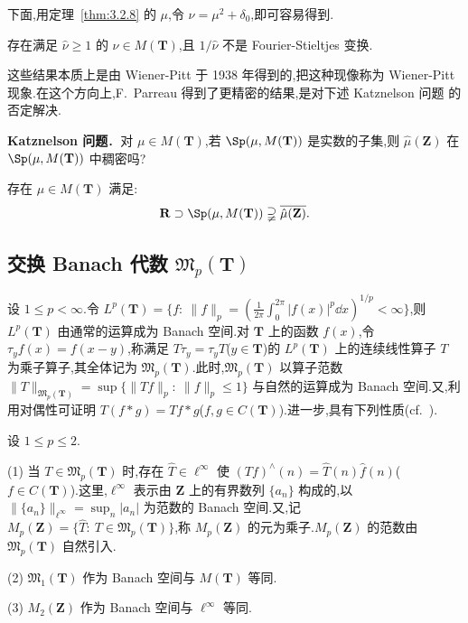 下面,用定理~\ref{thm:3.2.8} 的 $\mu$,令 $\nu = \mu^{2} + \delta_{0}$,即可容易得到.

\begin{corollary}\label{cor:3.2.9}
存在满足 $\hat{\nu} \geq 1$ 的 $\nu \in M(\mathbf{T})$,且 $1/\hat{\nu}$ 不是 Fourier-Stieltjes 变换.
\end{corollary}

这些结果本质上是由 Wiener-Pitt \cite{ch3:54} 于 1938 年得到的,把这种现像称为 Wiener-Pitt 现象.在这个方向上,F.\ Parreau 得到了更精密的结果,是对下述 Katznelson 问题 \cite{ch3:6} 的否定解决.

\textbf{Katznelson 问题}．对 $\mu \in M(\mathbf{T})$,若 $\Sp(\mu, M(\mathbf{T}))$ 是实数的子集,则 $\hat{\mu}(\mathbf{Z})$ 在 $\Sp(\mu, M(\mathbf{T}))$ 中稠密吗?

\begin{theorem}\label{thm:3.2.10}
存在 $\mu \in M(\mathbf{T})$ 满足:
\begin{equation*}
\mathbf{R} \supset \Sp(\mu, M(\mathbf{T})) \supsetneqq \overline{\hat{\mu}(\mathbf{Z})}.
\end{equation*}
\end{theorem}

\subsection{\texorpdfstring{交换 Banach 代数 $\mathfrak{M}_p(\mathbf{T})$}{交换 Banach 代数 M_p(T)}}\label{sec:3.2.4}

设 $1 \leq p < \infty$.令 $L^{p}(\mathbf{T}) = \{f:\ \|f\|_{p} = \left(\frac{1}{2\pi}\int_{0}^{2\pi}|f(x)|^{p}\dd x\right)^{1/p} < \infty\}$,则 $L^{p}(\mathbf{T})$ 由通常的运算成为 Banach 空间.对 $\mathbf{T}$ 上的函数 $f(x)$,令 $\tau_{y}f(x) = f(x - y)$,称满足 $T\tau_{y} = \tau_{y}T$($y \in \mathbf{T}$)的 $L^{p}(\mathbf{T})$ 上的连续线性算子 $T$ 为乘子算子,其全体记为 $\mathfrak{M}_{p}(\mathbf{T})$.此时,$\mathfrak{M}_{p}(\mathbf{T})$ 以算子范数 $\|T\|_{\mathfrak{M}_{p}(\mathbf{T})} = \sup\{\|Tf\|_{p}:\ \|f\|_{p} \leq 1\}$ 与自然的运算成为 Banach 空间.又,利用对偶性可证明 $T(f * g) = Tf * g$($f, g \in C(\mathbf{T})$).进一步,具有下列性质(cf.\ \cite{ch3:9}).

\begin{lemma}\label{lem:3.2.11}
设 $1 \leq p \leq 2$.

(1) 当 $T \in \mathfrak{M}_{p}(\mathbf{T})$ 时,存在 $\hat{T} \in \ell^{\infty}$ 使 $(Tf)^{\wedge}(n) = \hat{T}(n)\hat{f}(n)$($f \in C(\mathbf{T})$).这里,$\ell^{\infty}$ 表示由 $\mathbf{Z}$ 上的有界数列 $\{a_{n}\}$ 构成的,以 $\|\{a_{n}\}\|_{\ell^{\infty}} = \sup_{n}|a_{n}|$ 为范数的 Banach 空间.又,记 $M_{p}(\mathbf{Z}) = \{\hat{T}:\ T \in \mathfrak{M}_{p}(\mathbf{T})\}$,称 $M_{p}(\mathbf{Z})$ 的元为乘子.$M_{p}(\mathbf{Z})$ 的范数由 $\mathfrak{M}_{p}(\mathbf{T})$ 自然引入.

(2) $\mathfrak{M}_{1}(\mathbf{T})$ 作为 Banach 空间与 $M(\mathbf{T})$ 等同.

(3) $M_{2}(\mathbf{Z})$ 作为 Banach 空间与 $\ell^{\infty}$ 等同.
\end{lemma}

